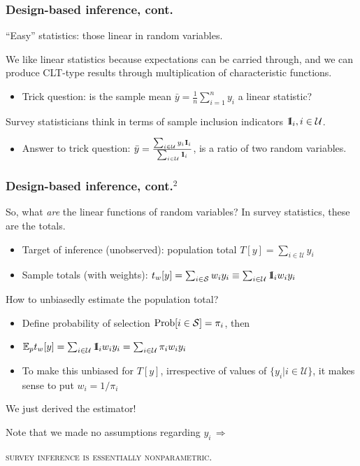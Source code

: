 \documentclass{beamer}
\newcommand{\Expect}{\mathbb{E}}
\newcommand{\One}{{\rm 1\kern-0.3em I}}
\begin{document}
\begin{frame}\frametitle{Design-based inference, cont.}

``Easy'' statistics: those linear in random variables.

\bigskip

We like linear statistics because expectations can be carried through,
and we can produce CLT-type results through multiplication of characteristic functions.

\begin{itemize}
    \item Trick question: is the sample mean $\bar y = \frac 1n\sum_{i=1}^n y_i$ a linear statistic?
\end{itemize}

\bigskip

Survey statisticians think in terms of sample inclusion indicators $\One_i, i\in\mathcal{U}$.

\begin{itemize}
    \item Answer to trick question: $\bar y = \frac{\sum_{i\in\mathcal{U}} y_i \One_i}{\sum_{i\in\mathcal{U}} \One_i}$,
        is a ratio of two random variables.
\end{itemize}

\end{frame}

\begin{frame}\frametitle{Design-based inference, cont.$^2$}

So, what \textit{are} the linear functions of random variables? In survey statistics, these are the totals.

\begin{itemize}
    \item Target of inference (unobserved): population total $T[y] = \sum_{i\in\mathcal{U}} y_i$
    \item Sample totals (with weights): $t_w[y] = \sum_{i\in\mathcal{S}} w_i y_i \equiv \sum_{i\in\mathcal{U}} \One_i w_i y_i$
\end{itemize}

How to unbiasedly estimate the population total?
\begin{itemize}
    \item Define probability of selection ${\rm Prob}[i\in\mathcal{S}]=\pi_i$, then
    \item $\Expect_p t_w[y] = \sum_{i\in\mathcal{U}} \One_i w_i y_i = \sum_{i\in\mathcal{U}} \pi_i w_i y_i$
    \item To make this unbiased for $T[y]$, irrespective of values of $\{ y_i| i\in \mathcal{U}\}$,
        it makes sense to put $w_i = 1/\pi_i$
\end{itemize}

We just derived the \citet{horvitz:thompson:1952} estimator!

\bigskip

Note that we made no assumptions regarding $y_i \, \Rightarrow$

\centering

\textsc{survey inference is essentially nonparametric}.

\end{frame}
\end{document}
